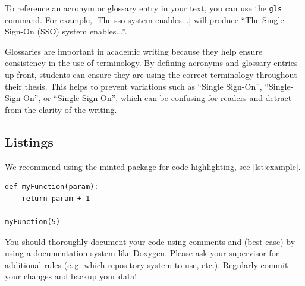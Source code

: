 To reference an acronym or glossary entry in your text, you can use the \texttt{gls} command. For example, \code|The \gls{sso} system enables...| will produce \enquote{The Single Sign-On (SSO) system enables...}.

Glossaries are important in academic writing because they help ensure consistency in the use of terminology. 
By defining acronyms and glossary entries up front, students can ensure they are using the correct terminology throughout their thesis. This helps to prevent variations such as \enquote{Single Sign-On}, \enquote{Single-Sign-On}, or \enquote{Single-Sign On}, which can be confusing for readers and detract from the clarity of the writing.

\subsection{Listings}

We recommend using the \href{https://de.overleaf.com/learn/latex/Code_Highlighting_with_minted}{minted} package for code highlighting, see \autoref{lst:example}.

\begin{listing}[htbp]
\begin{verbatim}
def myFunction(param):
	return param + 1

myFunction(5)
\end{verbatim}
\caption{Captions for listings are \emph{always below} the listing.}
\label{lst:example}
\end{listing}

You should thoroughly document your code using comments and (best case) by using a documentation system like Doxygen. Please ask your supervisor for additional rules (e.\,g. which repository system to use, etc.). Regularly commit your changes and backup your data!